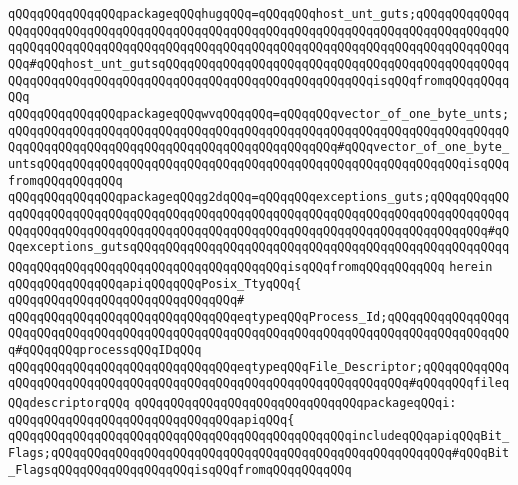 \verb|qQQqqQQqqQQqqQQqpackageqQQqhugqQQq=qQQqqQQqhost_unt_guts;qQQqqQQqqQQqqQQqqQQqqQQqqQQqqQQqqQQqqQQqqQQqqQQqqQQqqQQqqQQqqQQqqQQqqQQqqQQqqQQqqQQqqQQqqQQqqQQqqQQqqQQqqQQqqQQqqQQqqQQqqQQqqQQqqQQqqQQqqQQqqQQqqQQqqQQqqQQq#qQQqhost_unt_gutsqQQqqQQqqQQqqQQqqQQqqQQqqQQqqQQqqQQqqQQqqQQqqQQqqQQqqQQqqQQqqQQqqQQqqQQqqQQqqQQqqQQqqQQqqQQqqQQqqQQqisqQQqfromqQQqqQQqqQQq|\newline
\verb|qQQqqQQqqQQqqQQqpackageqQQqwvqQQqqQQq=qQQqqQQqvector_of_one_byte_unts;qQQqqQQqqQQqqQQqqQQqqQQqqQQqqQQqqQQqqQQqqQQqqQQqqQQqqQQqqQQqqQQqqQQqqQQqqQQqqQQqqQQqqQQqqQQqqQQqqQQqqQQqqQQqqQQqqQQq#qQQqvector_of_one_byte_untsqQQqqQQqqQQqqQQqqQQqqQQqqQQqqQQqqQQqqQQqqQQqqQQqqQQqqQQqqQQqisqQQqfromqQQqqQQqqQQq|\newline
\verb|qQQqqQQqqQQqqQQqpackageqQQqg2dqQQq=qQQqqQQqexceptions_guts;qQQqqQQqqQQqqQQqqQQqqQQqqQQqqQQqqQQqqQQqqQQqqQQqqQQqqQQqqQQqqQQqqQQqqQQqqQQqqQQqqQQqqQQqqQQqqQQqqQQqqQQqqQQqqQQqqQQqqQQqqQQqqQQqqQQqqQQqqQQqqQQqqQQq#qQQqexceptions_gutsqQQqqQQqqQQqqQQqqQQqqQQqqQQqqQQqqQQqqQQqqQQqqQQqqQQqqQQqqQQqqQQqqQQqqQQqqQQqqQQqqQQqqQQqqQQqisqQQqfromqQQqqQQqqQQq|\newline
\verb|herein|\newline
\newline
\verb|qQQqqQQqqQQqqQQqapiqQQqqQQqPosix_TtyqQQq{|\newline
\verb|qQQqqQQqqQQqqQQqqQQqqQQqqQQqqQQq#|\newline
\verb|qQQqqQQqqQQqqQQqqQQqqQQqqQQqqQQqeqtypeqQQqProcess_Id;qQQqqQQqqQQqqQQqqQQqqQQqqQQqqQQqqQQqqQQqqQQqqQQqqQQqqQQqqQQqqQQqqQQqqQQqqQQqqQQqqQQqqQQq#qQQqqQQqprocessqQQqIDqQQq|\newline
\verb|qQQqqQQqqQQqqQQqqQQqqQQqqQQqqQQqeqtypeqQQqFile_Descriptor;qQQqqQQqqQQqqQQqqQQqqQQqqQQqqQQqqQQqqQQqqQQqqQQqqQQqqQQqqQQqqQQqqQQq#qQQqqQQqfileqQQqdescriptorqQQq|\newline
\newline
\verb|qQQqqQQqqQQqqQQqqQQqqQQqqQQqqQQqpackageqQQqi:|\newline
\verb|qQQqqQQqqQQqqQQqqQQqqQQqqQQqqQQqapiqQQq{|\newline
\verb|qQQqqQQqqQQqqQQqqQQqqQQqqQQqqQQqqQQqqQQqqQQqqQQqincludeqQQqapiqQQqBit_Flags;qQQqqQQqqQQqqQQqqQQqqQQqqQQqqQQqqQQqqQQqqQQqqQQqqQQqqQQq#qQQqBit_FlagsqQQqqQQqqQQqqQQqqQQqisqQQqfromqQQqqQQqqQQq|\newline
